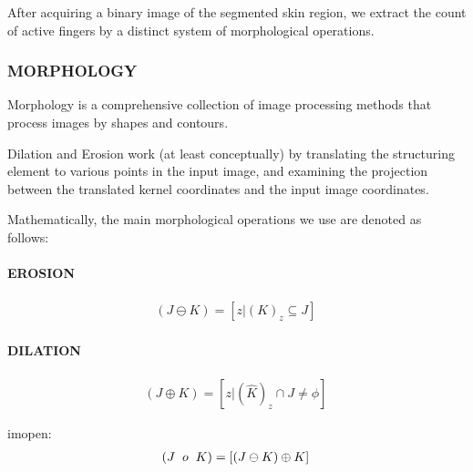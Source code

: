 \documentclass[conference]{IEEEtran}
\begin{document}
After acquiring a binary image of the segmented skin region, we extract the count of active fingers by a distinct system of morphological operations.


\subsubsection{MORPHOLOGY}

Morphology is a comprehensive collection of image processing methods that process images by shapes and contours.

Dilation and Erosion work (at least conceptually) by translating the structuring element to various points in the input image, and examining the projection between the translated kernel coordinates and the input image coordinates.

Mathematically, the main morphological operations we use are denoted as follows:

\paragraph{EROSION}
\begin{equation}
\begin{aligned}
\left(J \ominus K\right) = \left[z|(K)_z\subseteq J \right]\,
\end{aligned}
\end{equation}


\paragraph{DILATION}
\begin{equation}
\begin{aligned}
\left(J \oplus K\right) =  \left[z|(\widehat{K})_z\cap J \neq \phi \right]\,
\end{aligned}
\end{equation}

imopen:
\begin{equation}
\begin{aligned}
\left(J \hspace{2mm} o\hspace{2mm} K\right) =  \left[\left(J \ominus K \right) \oplus K \right]\,
\end{aligned}
\end{equation}
\end{document}
